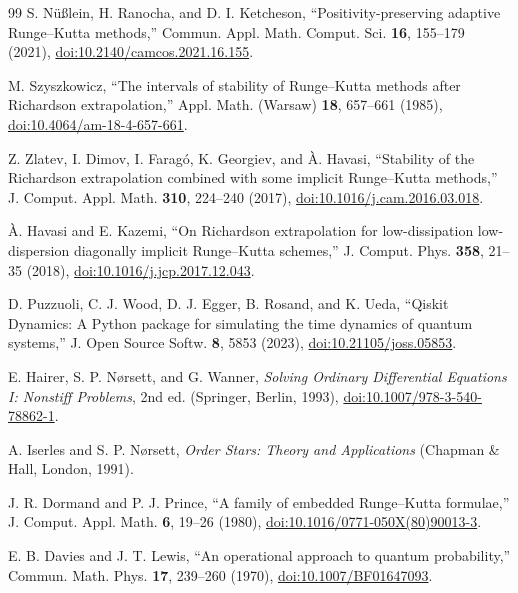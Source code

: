 \begin{thebibliography}{99}
S. N\"u{\ss}lein, H. Ranocha, and D. I. Ketcheson, ``Positivity-preserving adaptive Runge--Kutta methods,'' Commun. Appl. Math. Comput. Sci. \textbf{16}, 155--179 (2021), \href{https://doi.org/10.2140/camcos.2021.16.155}{doi:10.2140/camcos.2021.16.155}.

M. Szyszkowicz, ``The intervals of stability of Runge--Kutta methods after Richardson extrapolation,'' Appl. Math. (Warsaw) \textbf{18}, 657--661 (1985), \href{https://doi.org/10.4064/am-18-4-657-661}{doi:10.4064/am-18-4-657-661}.

Z. Zlatev, I. Dimov, I. Farag\'o, K. Georgiev, and \`A. Havasi, ``Stability of the Richardson extrapolation combined with some implicit Runge--Kutta methods,'' J. Comput. Appl. Math. \textbf{310}, 224--240 (2017), \href{https://doi.org/10.1016/j.cam.2016.03.018}{doi:10.1016/j.cam.2016.03.018}.

\`A. Havasi and E. Kazemi, ``On Richardson extrapolation for low-dissipation low-dispersion diagonally implicit Runge--Kutta schemes,'' J. Comput. Phys. \textbf{358}, 21--35 (2018), \href{https://doi.org/10.1016/j.jcp.2017.12.043}{doi:10.1016/j.jcp.2017.12.043}.

D. Puzzuoli, C. J. Wood, D. J. Egger, B. Rosand, and K. Ueda, ``Qiskit Dynamics: A Python package for simulating the time dynamics of quantum systems,'' J. Open Source Softw. \textbf{8}, 5853 (2023), \href{https://doi.org/10.21105/joss.05853}{doi:10.21105/joss.05853}.

E. Hairer, S. P. N\o rsett, and G. Wanner, \textit{Solving Ordinary Differential Equations I: Nonstiff Problems}, 2nd ed. (Springer, Berlin, 1993), \href{https://doi.org/10.1007/978-3-540-78862-1}{doi:10.1007/978-3-540-78862-1}.

A. Iserles and S. P. N\o rsett, \textit{Order Stars: Theory and Applications} (Chapman \& Hall, London, 1991).

J. R. Dormand and P. J. Prince, ``A family of embedded Runge--Kutta formulae,'' J. Comput. Appl. Math. \textbf{6}, 19--26 (1980), \href{https://doi.org/10.1016/0771-050X(80)90013-3}{doi:10.1016/0771-050X(80)90013-3}.

E. B. Davies and J. T. Lewis, ``An operational approach to quantum probability,'' Commun. Math. Phys. \textbf{17}, 239--260 (1970), \href{https://doi.org/10.1007/BF01647093}{doi:10.1007/BF01647093}.


\end{thebibliography}
